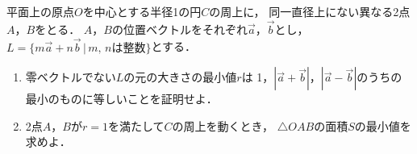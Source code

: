 \documentclass[../../main.tex]{subfiles}
\begin{document}
平面上の原点$O$を中心とする半径1の円$C$の周上に，
同一直径上にない異なる2点$A$，$B$をとる．
$A$，$B$の位置ベクトルをそれぞれ$\vec{a}$，$\vec{b}$とし，
$L=\{ m\vec{a}+n\vec{b} \, | \, m, \, n \text{は整数} \}$とする．
\begin{enumerate}
  \item 零ベクトルでない$L$の元の大きさの最小値$r$は
    1，$|\vec{a}+\vec{b}|$，$|\vec{a}-\vec{b}|$のうちの
    最小のものに等しいことを証明せよ．
  \item 2点$A$，$B$が$r=1$を満たして$C$の周上を動くとき，
    $\triangle OAB$の面積$S$の最小値を求めよ．
\end{enumerate}
\end{document}
